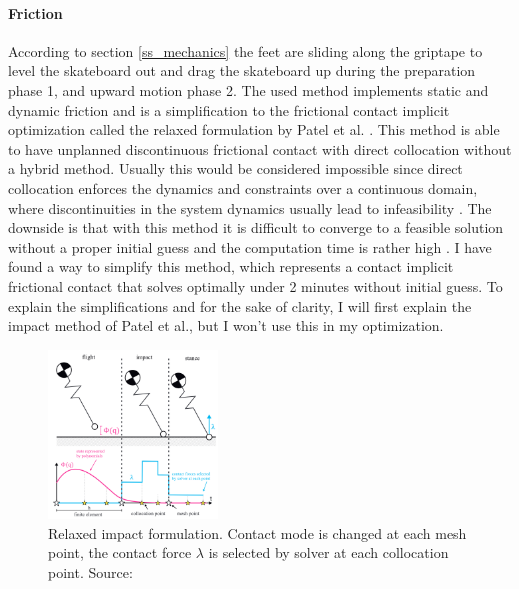 \paragraph{Friction}
\noindent According to section \ref{ss_mechanics} the feet are sliding along the griptape to level the skateboard out and drag the skateboard up during the preparation phase 1, and upward motion phase 2. The used method implements static and dynamic friction and is a simplification to the frictional contact implicit optimization called the relaxed formulation by Patel et al. \cite{patel_contact-implicit_2019}. This method is able to have unplanned discontinuous frictional contact with direct collocation without a hybrid method. Usually this would be considered impossible since direct collocation enforces the dynamics and constraints over a continuous domain, where discontinuities in the system dynamics usually lead to infeasibility \cite{kelly_transcription_2017}. The downside is that with this method it is difficult to converge to a feasible solution without a proper initial guess and the computation time is rather high \cite{shield_contact-implicit_2022,patel_contact-implicit_2019}. I have found a way to simplify this method, which represents a contact implicit frictional contact that solves optimally under 2 minutes without initial guess. To explain the simplifications and for the sake of clarity, I will first explain the impact method of Patel et al., but I won't use this in my optimization.

\begin{figure}
\centerline{\includegraphics[width=0.4\textwidth]{figure/relaxed_method.png}}
\caption[Relaxed impact method]{Relaxed impact formulation. Contact mode is changed at each mesh point, the contact force $\lambda$ is selected by solver at each collocation point. Source: \cite{patel_contact-implicit_2019}}
\label{f_relaxed}
\end{figure}

